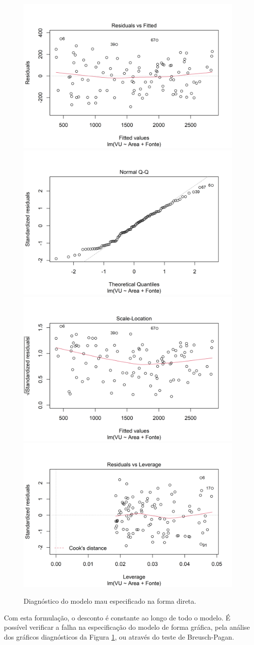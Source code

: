 \documentclass{article}
\begin{document}
\begin{figure}[H]
\includegraphics[width=0.5\linewidth]{./images/fitPlot-1} \includegraphics[width=0.5\linewidth]{./images/fitPlot-2} \includegraphics[width=0.5\linewidth]{./images/fitPlot-3} \includegraphics[width=0.5\linewidth]{./images/fitPlot-4} \caption{Diagnóstico do modelo mau especificado na forma direta.}\label{fig:fitPlot}
\end{figure}

Com esta formulação, o desconto é constante ao longo de todo o modelo. É
possível verificar a falha na especificação do modelo de forma gráfica,
pela análise dos gráficos diagnósticos da Figura \ref{fig:fitPlot}, ou
através do teste de Breusch-Pagan.
\end{document}
